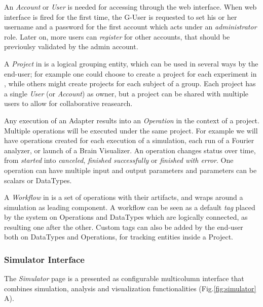     An \emph{Account} or \emph{User} is needed for accessing \TVB through
    the web interface.  When \TVB web interface is fired for the first
    time, the G-User is requested to set his or her username and a
    password for the first account which acts under an
    \emph{administrator} role. Later on, more users can \emph{register}
    for other accounts, that should be previoulsy validated by the admin
    account.

    A \emph{Project} in \TVB is a logical grouping entity, which  can be
    used in several ways by the end-user;  for example one could choose to
    create a project for each experiment in \TVB, while others might
    create projects for each subject of a group. Each project has a single
    \emph{User} (or \emph{Account}) as owner, but a project can be shared
    with multiple users to allow for collaborative reasearch.

    Any execution of an Adapter results into an \emph{Operation} in the
    context of a project. Multiple operations will be executed under the
    same project. For example we will have operations created for each
    execution of a simulation, each run of a Fourier analyzer, or launch
    of a Brain Visualizer. An operation changes status over time, from
    \emph{started} into \emph{canceled}, \emph{finished successfully} or
    \emph{finished with error}. One operation can have multiple input and
    output parameters and parameters can be scalars or DataTypes.

    A \emph{Workflow} in \TVB is a set of operations with their artifacts,
    and wraps around a simulation as leading component. A workflow can be
    seen as a default \emph{tag} placed by the system on Operations and
    DataTypes  which are logically connected, as resulting one after the
    other. Custom tags can also be added by the end-user both on DataTypes
    and Operations, for tracking entities inside a Project.

    \subsubsection{Simulator Interface}

    The \emph{Simulator} page is a presented as configurable multicolumn interface that combines \TVB simulation, analysis and visualization functionalities (Fig.\ref{fig:simulator} A).

